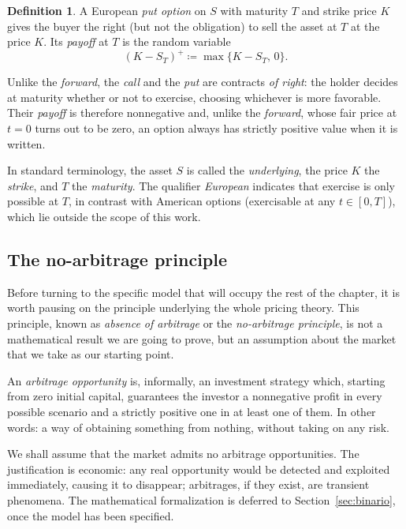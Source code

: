 \documentclass[11pt,a4paper,oneside]{report}
\theoremstyle{plain}
\theoremstyle{definition}
\newtheorem{definicion}[teorema]{Definition}
\theoremstyle{remark}
\newcommand{\1}{\mathbf{1}}
\newcommand{\eqdef}{\coloneqq}
\begin{document}
\begin{definicion}
A European \emph{put option} on $S$ with maturity $T$ and strike price
$K$ gives the buyer the right (but not the obligation) to sell the
asset at $T$ at the price $K$. Its \emph{payoff} at $T$ is the random
variable
\begin{equation*}
  (K - S_T)^+ \eqdef \max\{K - S_T,\, 0\}.
\end{equation*}
\end{definicion}

Unlike the \emph{forward}, the \emph{call} and the \emph{put} are
contracts \emph{of right}: the holder decides at maturity whether or
not to exercise, choosing whichever is more favorable. Their
\emph{payoff} is therefore nonnegative and, unlike the \emph{forward},
whose fair price at $t = 0$ turns out to be zero, an option always has
strictly positive value when it is written.

In standard terminology, the asset $S$ is
called the \emph{underlying}, the price $K$ the \emph{strike}, and $T$
the \emph{maturity}. The qualifier \emph{European} indicates that
exercise is only possible at $T$, in contrast with American options
(exercisable at any $t \in [0, T]$), which lie outside the scope of
this work.

\subsection{The no-arbitrage principle}
\label{subsec:noarbitraje}

Before turning to the specific model that will occupy the rest of the
chapter, it is worth pausing on the principle underlying the whole
pricing theory. This principle, known as \emph{absence of arbitrage}
or the \emph{no-arbitrage principle}, is not a mathematical result we
are going to prove, but an assumption about the market that we take
as our starting point.

An \emph{arbitrage opportunity}
is, informally, an investment strategy which, starting from zero
initial capital, guarantees the investor a nonnegative profit in every
possible scenario and a strictly positive one in at least one of them.
In other words: a way of obtaining something from nothing, without
taking on any risk.

We shall assume that the market admits no arbitrage opportunities. The
justification is economic: any real opportunity would be detected and
exploited immediately, causing it to disappear; arbitrages, if they
exist, are transient phenomena. The mathematical formalization is
deferred to Section~\ref{sec:binario}, once the model has been
specified.
\end{document}
